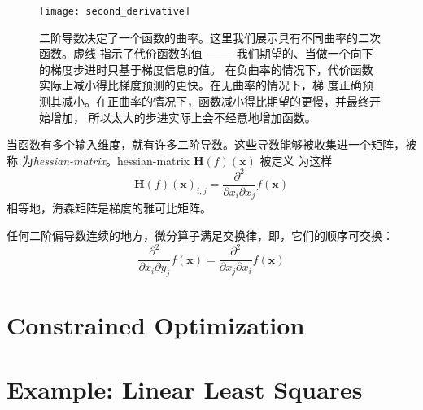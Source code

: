 \begin{figure}[h]
  \centering
  \texttt{[image: second\_derivative]}
  \caption{二阶导数决定了一个函数的曲率。这里我们展示具有不同曲率的二次函数。虚线
    指示了代价函数的值~——~我们期望的、当做一个向下的梯度步进时只基于梯度信息的值。
    在负曲率的情况下，代价函数实际上减小得比梯度预测的更快。在无曲率的情况下，梯
    度正确预测其减小。在正曲率的情况下，函数减小得比期望的更慢，并最终开始增加，
    所以太大的步进实际上会不经意地增加函数。\label{fig:second_derivative}}
\end{figure}

当函数有多个输入维度，就有许多二阶导数。这些导数能够被收集进一个矩阵，被称
为\emph{\gls{hessian-matrix}}。\gls*{hessian-matrix} $\pmb{H}(f)(\pmb{x})$ 被定义
为这样
\begin{equation}
  \pmb{H}(f)(\pmb{x})_{i,j} = \frac{\partial^2}{\partial x_i \partial x_j}f(\pmb{x})
\end{equation}
相等地，海森矩阵是梯度的雅可比矩阵。

任何二阶偏导数连续的地方，微分算子满足交换律，即，它们的顺序可交换：
\begin{equation}
  \frac{\partial^2}{\partial x_i \partial y_j}f(\pmb{x}) = \frac{\partial^2}{\partial x_j \partial x_i}f(\pmb{x})
\end{equation}

\section{Constrained Optimization}
\label{sec:constrained_optimization}

\section{Example: Linear Least Squares}
\label{sec:example:linear_least_squares}
